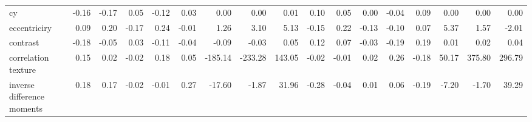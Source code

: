 \documentclass{article}
\begin{document}
\begin{table}[!ht]
{\begin{tabular}{lrrrrrrrrrrrrrrrr}
cy                                                                      & -0.16                    & -0.17                    & 0.05                     & -0.12                    & 0.03                     & 0.00                     & 0.00                     & 0.01                     & 0.10                     & 0.05                     & 0.00                     & -0.04                    & 0.09                     & 0.00                     & 0.00                     & 0.00                     \\
eccentriciry                                                            & 0.09                     & 0.20                     & -0.17                    & 0.24                     & -0.01                    & 1.26                     & 3.10                     & 5.13                     & -0.15                    & 0.22                     & -0.13                    & -0.10                    & 0.07                     & 5.37                     & 1.57                     & -2.01                    \\
contrast                                                                & -0.18                    & -0.05                    & 0.03                     & -0.11                    & -0.04                    & -0.09                    & -0.03                    & 0.05                     & 0.12                     & 0.07                     & -0.03                    & -0.19                    & 0.19                     & 0.01                     & 0.02                     & 0.04                     \\
correlation texture                                                     & 0.15                     & 0.02                     & -0.02                    & 0.18                     & 0.05                     & -185.14                  & -233.28                  & 143.05                   & -0.02                    & -0.01                    & 0.02                     & 0.26                     & -0.18                    & 50.17                    & 375.80                   & 296.79                   \\
inverse difference moments                                              & 0.18                     & 0.17                     & -0.02                    & -0.01                    & 0.27                     & -17.60                   & -1.87                    & 31.96                    & -0.28                    & -0.04                    & 0.01                     & 0.06                     & -0.19                    & -7.20                    & -1.70                    & 39.29                    \\

\end{tabular}}
\end{table}
\end{document}
